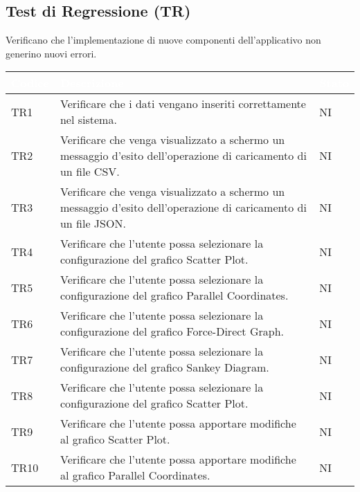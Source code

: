     \subsection{Test di Regressione (TR)} Verificano che l'implementazione di nuove componenti dell'applicativo non generino nuovi errori.
    \begin{center}
        \renewcommand\arraystretch{1.5}
        \centering
        \begin{longtable}{|p{1.5cm}|p{11cm}|p{1cm}|}
        \hline
        \rowcolor[HTML]{036400}
        \textcolor{white}{\textbf{Codice}} & \textcolor{white}{\textbf{Descrizione}} & \textcolor{white}{\textbf{Stato}} \\ \hline
            \rowcolor[HTML]{C0C0C0}
            TR1 & Verificare che i dati vengano inseriti correttamente nel sistema. & NI\\ \hline
            \rowcolor[HTML]{EFEFEF}
            TR2 & Verificare che venga visualizzato a schermo un messaggio d’esito dell’operazione di caricamento di un file CSV.& NI\\ \hline
            \rowcolor[HTML]{C0C0C0}
            TR3 & Verificare che venga visualizzato a schermo un messaggio d’esito dell’operazione di caricamento di un file JSON.& NI\\ \hline
            \rowcolor[HTML]{EFEFEF}
            TR4 & Verificare che l’utente possa selezionare la configurazione del grafico Scatter Plot. & NI\\ \hline
            \rowcolor[HTML]{C0C0C0}
            TR5 & Verificare che l’utente possa selezionare la configurazione del grafico Parallel Coordinates. & NI\\ \hline
            \rowcolor[HTML]{EFEFEF}
            TR6 & Verificare che l’utente possa selezionare la configurazione del grafico Force-Direct Graph. & NI\\ \hline
            \rowcolor[HTML]{C0C0C0}
            TR7 & Verificare che l’utente possa selezionare la configurazione del grafico Sankey Diagram. & NI\\ \hline
            \rowcolor[HTML]{EFEFEF}
            TR8 & Verificare che l’utente possa selezionare la configurazione del grafico Scatter Plot. & NI\\ \hline
            \rowcolor[HTML]{C0C0C0}
            TR9 & Verificare che l’utente possa apportare modifiche al grafico Scatter Plot. & NI\\ \hline
            \rowcolor[HTML]{EFEFEF}
            TR10 & Verificare che l’utente possa apportare modifiche al grafico Parallel Coordinates. & NI\\ \hline

\end{longtable}
\end{center}
